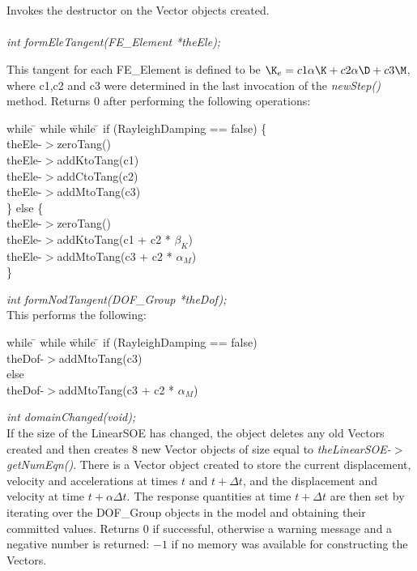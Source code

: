  \\
\\ 
Invokes the destructor on the Vector objects created. \\

\\
{\em int formEleTangent(FE\_Element *theEle);} 

This tangent for each FE\_Element is defined to be $\K_e = c1\alpha \K
+ c2\alpha \D + c3 \M$, where c1,c2 and c3 were determined in the last invocation
of the {\em newStep()} method. Returns $0$ after performing the
following operations:  
\begin{tabbing}
while \= \+ while \= while \= \kill
if (RayleighDamping == false) \{ \+ \\
theEle-$>$zeroTang() \\
theEle-$>$addKtoTang(c1) \\
theEle-$>$addCtoTang(c2) \\
theEle-$>$addMtoTang(c3)  \- \\
\} else \{ \+ \\
theEle-$>$zeroTang() \\
theEle-$>$addKtoTang(c1 + c2 * $\beta_K$) \\
theEle-$>$addMtoTang(c3 + c2 * $\alpha_M$)  \- \\ 
\}
\end{tabbing}

{\em int formNodTangent(DOF\_Group *theDof);} \\
This performs the following:
\begin{tabbing}
while \= \+ while \= while \= \kill
if (RayleighDamping == false)  \+ \\
theDof-$>$addMtoTang(c3)  \- \\
else \+ \\
theDof-$>$addMtoTang(c3 + c2 * $\alpha_M$)  \- \\ 
\end{tabbing}


{\em int domainChanged(void);}\\
If the size of the LinearSOE has changed, the object deletes any old Vectors
created and then creates $8$ new Vector objects of size equal to {\em
theLinearSOE-$>$getNumEqn()}. There is a Vector object created to store
the current displacement, velocity and accelerations at times $t$ and
$t + \Delta t$, and the displacement and velocity at time $t + \alpha
\Delta t$. The response quantities at time $t + \Delta t$ are
then set by iterating over the DOF\_Group objects in the model and
obtaining their committed values. 
Returns $0$ if successful, otherwise a warning message and a negative
number is returned: $-1$ if no memory was available for constructing
the Vectors. \\


